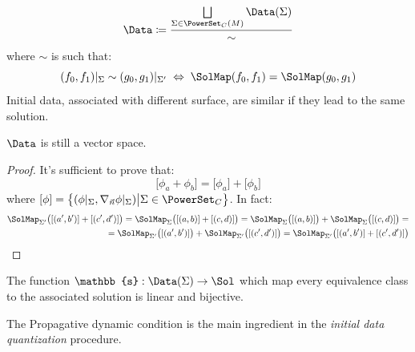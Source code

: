 \documentclass[Main]{subfiles}
\begin{document}
			\begin{definition}
				\begin{displaymath}
					\Data  \coloneqq \frac{\bigsqcup\limits_{\Sigma \in \PowerSet_C(M)}\Data(\Sigma)}{\sim} 
				\end{displaymath}
				where $\sim$ is such that:
				\begin{displaymath}
					(f_0, f_1)|_\Sigma \sim (g_0, g_1)|_{\Sigma'} \; \Leftrightarrow \; \SolMap(f_0,f_1) =  \SolMap(g_0,g_1) 
				\end{displaymath}
				\footnotesize{ Initial data, associated with different surface, are similar if they lead to the same solution.}	
			\end{definition}
			
			\begin{proposition}
				$\Data$ is still a vector space.
			\end{proposition}
			\begin{proof}
				It's sufficient to prove that:
				\begin{displaymath}
					\big[ \phi_a + \phi_b \big] = \big[ \phi_a \big] + \big[ \phi_b \big]
				\end{displaymath}
				where $[\phi]= \big\{(\phi\vert_\Sigma , \nabla_{\vec{n}}\phi \vert_\Sigma) \big\vert \Sigma \in \PowerSet_C \big\}$.
				In fact:
				\begin{align*}
					 \SolMap_{\Sigma'}\big([(a',b')] + [(c',d')] \big)=\SolMap_\Sigma\big([(a,b)] + [(c,d)] \big) = \SolMap_\Sigma\big([(a,b)] \big)+ \SolMap_\Sigma\big([(c,d)] \big) =\\
					 =\SolMap_{\Sigma'}\big([(a',b')] \big)+ \SolMap_{\Sigma'}\big([(c',d')] \big) = \SolMap_{\Sigma'}\big([(a',b')] +[(c',d')] \big)
				\end{align*}

			\end{proof}
			\begin{corollary}
				The function  $ 	 \mathbb{s} : \Data (\Sigma ) \rightarrow \Sol $ which map every equivalence class to the associated solution is linear and bijective.
			\end{corollary}
		\begin{observation}
			The Propagative dynamic condition  is the main ingredient in the \emph{initial data quantization} procedure\cite{Wald1994}.	
		\end{observation}	
	
	
\end{document}
